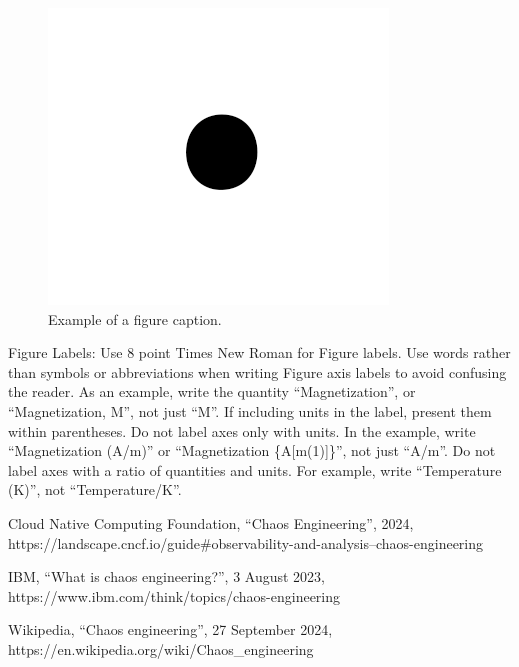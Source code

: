 \documentclass[conference]{IEEEtran}
\begin{document}
\begin{figure}[htbp]
\centerline{\includegraphics{fig1.png}}
\caption{Example of a figure caption.}
\label{fig}
\end{figure}

Figure Labels: Use 8 point Times New Roman for Figure labels. Use words 
rather than symbols or abbreviations when writing Figure axis labels to 
avoid confusing the reader. As an example, write the quantity 
``Magnetization'', or ``Magnetization, M'', not just ``M''. If including 
units in the label, present them within parentheses. Do not label axes only 
with units. In the example, write ``Magnetization (A/m)'' or ``Magnetization 
\{A[m(1)]\}'', not just ``A/m''. Do not label axes with a ratio of 
quantities and units. For example, write ``Temperature (K)'', not 
``Temperature/K''.

\begin{thebibliography}{00}
 Cloud Native Computing Foundation,  ``Chaos Engineering'',  2024,  https://landscape.cncf.io/guide\#observability-and-analysis--chaos-engineering

 IBM, ``What is chaos engineering?'', 3 August 2023,  https://www.ibm.com/think/topics/chaos-engineering

 Wikipedia, ``Chaos engineering'', 27 September 2024, https://en.wikipedia.org/wiki/Chaos\_engineering

\end{thebibliography}
\end{document}
